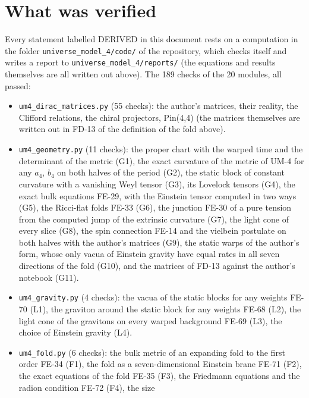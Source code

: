 \documentclass[
  10pt,
]{article}
\providecommand{\tightlist}{%
  \setlength{\itemsep}{0pt}\setlength{\parskip}{0pt}}
\begin{document}
\hypertarget{what-was-verified}{%
\section{What was verified}\label{what-was-verified}}

Every statement labelled DERIVED in this document rests on a computation
in the folder \texttt{universe\_model\_4/code/} of the repository, which
checks itself and writes a report to
\texttt{universe\_model\_4/reports/} (the equations and results
themselves are all written out above). The 189 checks of the 20 modules,
all passed:

\begin{itemize}
\tightlist
\item
  \texttt{um4\_dirac\_matrices.py} (55 checks): the author's matrices,
  their reality, the Clifford relations, the chiral projectors, Pin(4,4)
  (the matrices themselves are written out in FD-13 of the definition of
  the fold above).
\item
  \texttt{um4\_geometry.py} (11 checks): the proper chart with the
  warped time and the determinant of the metric (G1), the exact
  curvature of the metric of UM-4 for any \(a_4\), \(b_4\) on both
  halves of the period (G2), the static block of constant curvature with
  a vanishing Weyl tensor (G3), its Lovelock tensors (G4), the exact
  bulk equations FE-29, with the Einstein tensor computed in two ways
  (G5), the Ricci-flat folds FE-33 (G6), the junction FE-30 of a pure
  tension from the computed jump of the extrinsic curvature (G7), the
  light cone of every slice (G8), the spin connection FE-14 and the
  vielbein postulate on both halves with the author's matrices (G9), the
  static warps of the author's form, whose only vacua of Einstein
  gravity have equal rates in all seven directions of the fold (G10),
  and the matrices of FD-13 against the author's notebook (G11).
\item
  \texttt{um4\_gravity.py} (4 checks): the vacua of the static blocks
  for any weights FE-70 (L1), the graviton around the static block for
  any weights FE-68 (L2), the light cone of the gravitons on every
  warped background FE-69 (L3), the choice of Einstein gravity (L4).
\item
  \texttt{um4\_fold.py} (6 checks): the bulk metric of an expanding fold
  to the first order FE-34 (F1), the fold as a seven-dimensional
  Einstein brane FE-71 (F2), the exact equations of the fold FE-35 (F3),
  the Friedmann equations and the radion condition FE-72 (F4), the size

\end{itemize}
\end{document}
